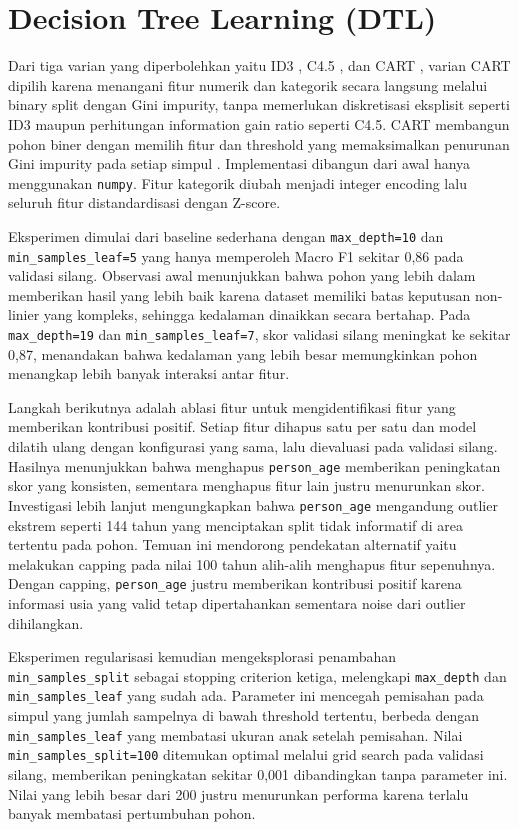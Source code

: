 \documentclass{article}
\begin{document}
\section{Decision Tree Learning (DTL)}

Dari tiga varian yang diperbolehkan yaitu ID3 \cite{quinlan1986id3}, C4.5 \cite{quinlan1993c45}, dan CART \cite{breiman1984cart}, varian CART dipilih karena menangani fitur numerik dan kategorik secara langsung melalui binary split dengan Gini impurity, tanpa memerlukan diskretisasi eksplisit seperti ID3 maupun perhitungan information gain ratio seperti C4.5. CART membangun pohon biner dengan memilih fitur dan threshold yang memaksimalkan penurunan Gini impurity pada setiap simpul \cite{breiman1984cart,hastie2009esl}. Implementasi dibangun dari awal hanya menggunakan \texttt{numpy}. Fitur kategorik diubah menjadi integer encoding lalu seluruh fitur distandardisasi dengan Z-score.

Eksperimen dimulai dari baseline sederhana dengan \texttt{max\_depth=10} dan \texttt{min\_samples\_leaf=5} yang hanya memperoleh Macro F1 sekitar 0,86 pada validasi silang. Observasi awal menunjukkan bahwa pohon yang lebih dalam memberikan hasil yang lebih baik karena dataset memiliki batas keputusan non-linier yang kompleks, sehingga kedalaman dinaikkan secara bertahap. Pada \texttt{max\_depth=19} dan \texttt{min\_samples\_leaf=7}, skor validasi silang meningkat ke sekitar 0,87, menandakan bahwa kedalaman yang lebih besar memungkinkan pohon menangkap lebih banyak interaksi antar fitur.

Langkah berikutnya adalah ablasi fitur untuk mengidentifikasi fitur yang memberikan kontribusi positif. Setiap fitur dihapus satu per satu dan model dilatih ulang dengan konfigurasi yang sama, lalu dievaluasi pada validasi silang. Hasilnya menunjukkan bahwa menghapus \texttt{person\_age} memberikan peningkatan skor yang konsisten, sementara menghapus fitur lain justru menurunkan skor. Investigasi lebih lanjut mengungkapkan bahwa \texttt{person\_age} mengandung outlier ekstrem seperti 144 tahun yang menciptakan split tidak informatif di area tertentu pada pohon. Temuan ini mendorong pendekatan alternatif yaitu melakukan capping pada nilai 100 tahun alih-alih menghapus fitur sepenuhnya. Dengan capping, \texttt{person\_age} justru memberikan kontribusi positif karena informasi usia yang valid tetap dipertahankan sementara noise dari outlier dihilangkan.

Eksperimen regularisasi kemudian mengeksplorasi penambahan \texttt{min\_samples\_split} sebagai stopping criterion ketiga, melengkapi \texttt{max\_depth} dan \texttt{min\_samples\_leaf} yang sudah ada. Parameter ini mencegah pemisahan pada simpul yang jumlah sampelnya di bawah threshold tertentu, berbeda dengan \texttt{min\_samples\_leaf} yang membatasi ukuran anak setelah pemisahan. Nilai \texttt{min\_samples\_split=100} ditemukan optimal melalui grid search pada validasi silang, memberikan peningkatan sekitar 0,001 dibandingkan tanpa parameter ini. Nilai yang lebih besar dari 200 justru menurunkan performa karena terlalu banyak membatasi pertumbuhan pohon.
\end{document}
